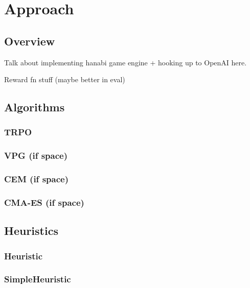 \section{Approach}
\label{approach}

\subsection{Overview}

Talk about implementing hanabi game engine + hooking up to OpenAI here.

Reward fn stuff (maybe better in eval)

\subsection{Algorithms}

\subsubsection{TRPO}

\cite{TRPO}

\subsubsection{VPG (if space)}
\subsubsection{CEM (if space)}
\subsubsection{CMA-ES (if space)}

\subsection{Heuristics}
\subsubsection{Heuristic}
\subsubsection{SimpleHeuristic}


